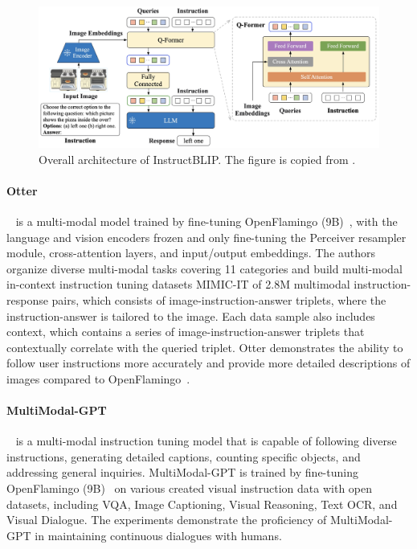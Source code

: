 \documentclass[11pt]{article}
\begin{document}
\begin{figure}[t]
  \centering
  \begin{minipage}[t]{0.5\textwidth}
    \centering
    \includegraphics[width=1\textwidth]{figures/InstructBLIP.jpg}
  \end{minipage}%
  \caption{Overall architecture of InstructBLIP. The figure is copied from \citet{Dai2023InstructBLIPTG}.}
  \label{fig:InstructBLIP}
\end{figure}

\paragraph{Otter}~\citep{Li2023OtterAM} is a multi-modal model trained by fine-tuning OpenFlamingo (9B)~\citep{anas_awadalla_2023_7733589}, with the language and vision encoders frozen and only fine-tuning the Perceiver resampler module, cross-attention layers, and input/output embeddings. The authors organize diverse multi-modal tasks covering 11 categories and build multi-modal in-context instruction tuning datasets MIMIC-IT of 2.8M multimodal instruction-response pairs, which consists of image-instruction-answer triplets, where the instruction-answer is tailored to the image. Each data sample also includes context, which contains a series of image-instruction-answer triplets that contextually correlate with the queried triplet. Otter demonstrates the ability to follow user instructions more accurately and provide more detailed descriptions of images compared to OpenFlamingo~\citep{anas_awadalla_2023_7733589}. 

\paragraph{MultiModal-GPT}~\citep{Gong2023MultiModalGPTAV} is a multi-modal instruction tuning model that is capable of following diverse instructions, generating detailed captions, counting specific objects, and addressing general inquiries. MultiModal-GPT is trained by fine-tuning OpenFlamingo (9B)~\citep{anas_awadalla_2023_7733589} on various created visual instruction data with open datasets, including VQA, Image Captioning, Visual Reasoning, Text OCR, and Visual Dialogue. The experiments demonstrate the proficiency of MultiModal-GPT in maintaining continuous dialogues with humans.
\end{document}
